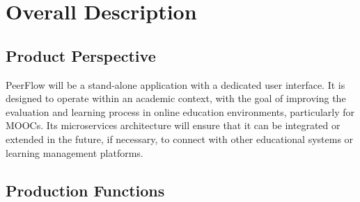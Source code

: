 \chapter{Overall Description}

\section{Product Perspective}

\begin{justify}
    PeerFlow will be a stand-alone application with a dedicated user interface. It is designed to operate within an academic context, with the goal of improving the evaluation and learning process in online education environments, particularly for MOOCs. Its microservices architecture will ensure that it can be integrated or extended in the future, if necessary, to connect with other educational systems or learning management platforms.
\end{justify}

\section{Production Functions}

\begin{comment}
        \item \textbf{Course Management:}
        \begin{itemize}
            \item Creation of new courses by teachers.
            \item Modification and deletion of existing courses by teachers.
            \item Viewing available courses by students.
            \item Enrollment of students in courses.
            \item Unenrollment of students from courses.
        \end{itemize}
\end{comment}


